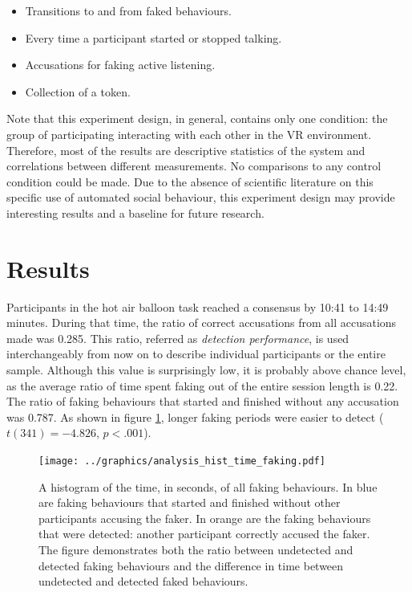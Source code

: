 \documentclass[]{simple-thesis}
\begin{document}
\begin{itemize}
  \item Transitions to and from faked behaviours.
  \item Every time a participant started or stopped talking.
  \item Accusations for faking active listening.
  \item Collection of a token.
\end{itemize}

Note that this experiment design, in general, contains only one condition: the group of participating interacting with each other in the VR environment.
Therefore, most of the results are descriptive statistics of the system and correlations between different measurements.
No comparisons to any control condition could be made.
Due to the absence of scientific literature on this specific use of automated social behaviour, this experiment design may provide interesting results and a baseline for future research.

\section{Results}

Participants in the hot air balloon task reached a consensus by 10:41 to 14:49 minutes.
During that time, the ratio of correct accusations from all accusations made was 0.285.
This ratio, referred as \textit{detection performance}, is used interchangeably from now on to describe individual participants or the entire sample.
Although this value is surprisingly low, it is probably above chance level, as the average ratio of time spent faking out of the entire session length is 0.22.
The ratio of faking behaviours that started and finished without any accusation was 0.787.
As shown in figure \ref{fig:analysis:hist_time_faking}, longer faking periods were easier to detect ($t(341) = -4.826$, $p < .001$).

\begin{figure}
  \centering
  \texttt{[image: ../graphics/analysis\_hist\_time\_faking.pdf]}
  \caption{A histogram of the time, in seconds, of all faking behaviours. In blue are faking behaviours that started and finished without other participants accusing the faker. In orange are the faking behaviours that were detected: another participant correctly accused the faker. The figure demonstrates both the ratio between undetected and detected faking behaviours and the difference in time between undetected and detected faked behaviours.}
  \label{fig:analysis:hist_time_faking}
\end{figure}
\end{document}
